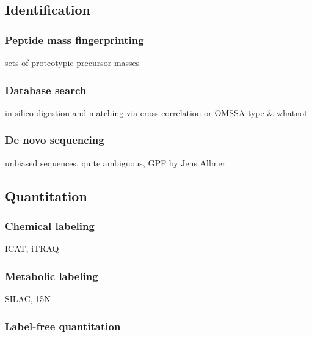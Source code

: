 \subsection{Identification}

\subsubsection{Peptide mass fingerprinting}

\begin{todo}
sets of proteotypic precursor masses
\end{todo}

\subsubsection{Database search}

\begin{todo}
in silico digestion and matching via cross correlation or OMSSA-type & whatnot
\end{todo}

\subsubsection{De novo sequencing}

\begin{todo}
unbiased sequences, quite ambiguous, GPF by Jens Allmer
\end{todo}

\subsection{Quantitation}

\subsubsection{Chemical labeling}
 
\begin{todo}
ICAT, iTRAQ
\end{todo}

\subsubsection{Metabolic labeling}

\begin{todo}
SILAC, 15N
\end{todo}

\subsubsection{Label-free quantitation}

